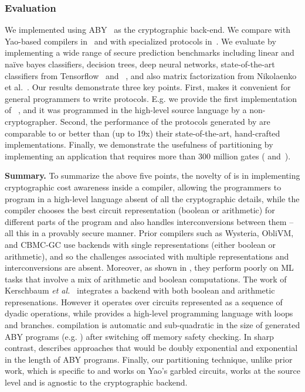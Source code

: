 \subsubsection{Evaluation}We implemented \tool
using ABY~\cite{aby} as the
cryptographic back-end.
We compare \tool with Yao-based compilers in~
and with specialized protocols in~. 
 We evaluate \tool by implementing a wide range
of secure prediction benchmarks including linear and na\"{i}ve bayes
classifiers, decision trees, deep neural networks, state-of-the-art
classifiers from Tensorflow~\cite{tensorflow}
and \bonsai~\cite{bonsai}, and also matrix factorization from Nikolaenko et al.~\cite{valeriaMatrix}. Our results demonstrate
three key points. First, \tool makes it convenient for general
programmers to write \mpc protocols. E.g. we provide the first \mpc
implementation of \bonsai~\cite{bonsai}, and it was programmed in the
high-level \tool source language by a non-cryptographer. Second, the
performance
of the protocols
generated by \tool are comparable to or better than (up to 19x) their state-of-the-art, hand-crafted implementations. Finally, we
demonstrate the usefulness of partitioning by implementing an application
that requires more than 300 million gates ( and~).

\noindent\textbf{Summary.} To summarize the above five points, the novelty of \tool is in implementing cryptographic cost awareness inside a compiler, allowing the programmers to program in a high-level language absent of all the cryptographic details, while the compiler chooses the best circuit representation (boolean or arithmetic) for different parts of the program and also handles interconversions between them -- all this in a provably secure manner. Prior compilers such as Wysteria, ObliVM, and CBMC-GC use backends with single representations (either boolean or arithmetic), and so the  challenges associated with multiple representations and interconversions are absent. Moreover, as shown in , they perform poorly on ML tasks that involve a mix of arithmetic and boolean computations. The work of Kerschbaum {\em et al.}~\cite{autoS} integrates a backend with both boolean and arithmetic represenations. However it operates over circuits represented as a sequence of dyadic operations, while \tool provides a high-level programming language with loops and branches. \tool compilation is automatic and sub-quadratic in the size of generated ABY programs (e.g. ) after switching off memory safety checking. In sharp contrast, \cite{autoS} describes approaches that would be doubly exponential and exponential in the length of ABY programs. Finally, our partitioning technique, unlike prior work, which is specific to and works on Yao’s garbled circuits, works at the source level and is agnostic to the cryptographic backend.

